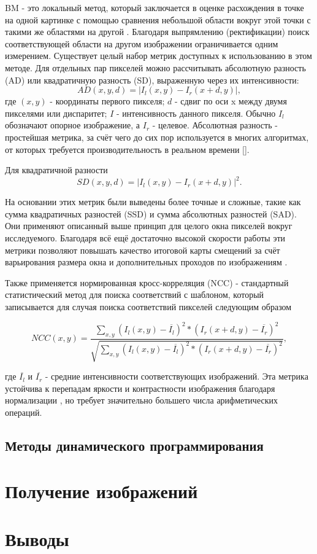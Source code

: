 BM - это локальный метод, который заключается в оценке расхождения в точке на одной картинке с помощью сравнения небольшой области вокруг этой точки с такими же областями 
на другой \cite{}. Благодаря выпрямлению (ректификации) поиск соответствующей области на другом изображении ограничивается одним измерением. Существует целый набор метрик доступных 
к использованию в этом методе. 
Для отдельных пар пикселей можно рассчитывать абсолютную разность (AD) или квадратичную разность (SD), выраженную через их интенсивности:
\begin{equation}
	AD(x, y, d) = |I_l(x,y) - I_r(x+d, y)|,			
	\label{eq:AD}
\end{equation}
где $(x, y)$ - координаты первого пикселя; $d$ - сдвиг по оси x между двумя пикселями или диспаритет; $I$ - интенсивность данного пикселя. Обычно $I_l$ обозначают опорное изображение, а $I_r$ - 
целевое. Абсолютная разность - простейшая метрика, за счёт чего до сих пор используется в многих алгоритмах, от которых требуется производительность в реальном времени []. 

Для квадратичной разности 
\begin{equation}
	SD(x, y, d) = |I_l(x,y) - I_r(x+d, y)|^2.		
	\label{eq:SD}
\end{equation}

На основании этих метрик были выведены более точные и сложные, такие как сумма квадратичных разностей (SSD) и сумма абсолютных разностей (SAD). Они применяют описанный выше принцип для целого 
окна пикселей вокруг исследуемого. Благодаря всё ещё достаточно высокой скорости работы эти метрики позволяют повышать качество итоговой карты смещений за счёт варьирования размера окна и 
дополнительных проходов по изображениям \cite{twosizewindow}. 

Также применяется нормированная кросс-корреляция (NCC) - стандартный статистический метод для поиска соответствий с шаблоном, который записывается для случая поиска соответствий пикселей следующим образом 

\begin{equation}
	NCC(x, y) = \frac{ \sum_{x, y}^{} (I_l(x, y) - \overline{I_l} )^2 * ( I_r(x + d, y) - \overline{I_r} )^2   }{ \sqrt{ \sum_{x, y}^{} (I_l(x, y) - \overline{I_l} )^2 * ( I_r(x + d, y) - \overline{I_r} )^2 }  }, 
	\label{equ:NCC}
\end{equation}

где $\overline{I_l}$ и $\overline{I_r}$ - средние интенсивности соответствующих изображений. Эта метрика устойчива к перепадам яркости и контрастности изображения благодаря нормализации \cite{ncceval}, 
но требует значительно большего числа арифметических операций. 

\subsection{Методы динамического программирования}



\section{Получение изображений}


\section{Выводы}

\newpage





